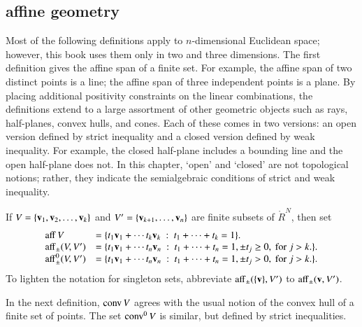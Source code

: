 \subsection{affine geometry}




\begin{summary}Most of the following definitions apply to $n$-dimensional
Euclidean space; however, this book uses them only in
two and three dimensions.  The first definition 
gives the affine span of a finite set.  For example,
the affine span of two distinct points is a line;
the affine span of three independent points is a plane.
By placing additional
positivity constraints on the linear combinations, the definitions
extend to a large assortment of other geometric objects
such as rays, half-planes, convex hulls, and cones.  
Each of these comes in two versions: an open version
defined by strict inequality and a closed version defined
by weak inequality.  For example, the closed half-plane
includes a bounding line and the open half-plane does
not.  In this chapter, `open' and `closed' are not topological notions; rather, they
indicate the semialgebraic conditions of strict  and weak inequality.
\end{summary}


\begin{definition}[affine]\label{def:aff} 
 If $V = \{{\mathbf v}_1,{\mathbf v}_2,\ldots,{\mathbf v}_k\}$ 
and $V'=\{{\mathbf v}_{k+1},\ldots,{\mathbf v}_n\}$ are  finite subsets of $\ring{R}^N$, then
set
	$$\begin{array}{lll}
      {\operatorname{aff}}\, V &= \{t_1 {\mathbf v}_1 +\cdots t_k {\mathbf v}_k \ :\ 
	t_1 +\cdots+t_k = 1\}.\\
        {\operatorname{aff}}_{\pm} (V,V') &= \{t_1 {\mathbf v}_1 +\cdots t_n {\mathbf v}_n \ :\ 
	t_1 +\cdots+t_n = 1, \pm t_j \ge 0, \text{ for } j>k.\}.\\
        {\operatorname{aff}}^0_{\pm} (V,V') &= \{t_1 {\mathbf v}_1 +\cdots t_n {\mathbf v}_n \ :\ 
	t_1 +\cdots+t_n = 1, \pm t_j > 0, \text{ for } j>k.\}.\\
		\end{array}
        $$
To lighten the notation for singleton sets, abbreviate ${\operatorname{aff}}_\pm(\{{\mathbf v}\},V')$ to
${\operatorname{aff}}_\pm({\mathbf v},V')$.
%
%
%
%
%
\end{definition}


In the next definition, ${\operatorname{conv}}\,V$ agrees with the usual
notion of the convex hull of a finite set of points.
The set ${\operatorname{conv}}^0\,V$ is similar, but defined by strict inequalities.


